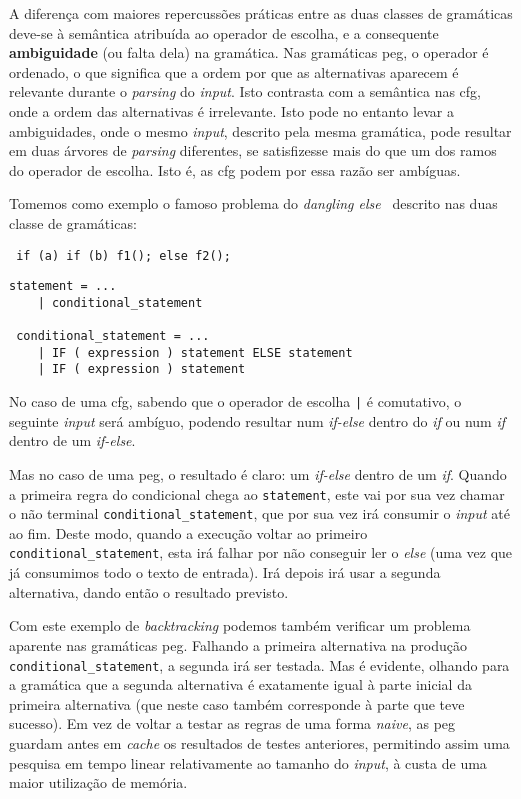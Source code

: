 A diferença com maiores repercussões práticas entre as duas classes de gramáticas deve-se à semântica atribuída ao operador de escolha, e a consequente \textbf{ambiguidade} (ou falta dela) na gramática. Nas gramáticas \acrshort{peg}, o operador é ordenado, o que significa que a ordem por que as alternativas aparecem é relevante durante o \textit{parsing} do \textit{input}. Isto contrasta com a semântica nas \acrshort{cfg}, onde a ordem das alternativas é irrelevante. Isto pode no entanto levar a ambiguidades, onde o mesmo \textit{input}, descrito pela mesma gramática, pode resultar em duas árvores de \textit{parsing} diferentes, se satisfizesse mais do que um dos ramos do operador de escolha. Isto é, as \acrshort{cfg} podem por essa razão ser ambíguas.

Tomemos como exemplo o famoso problema do \textit{dangling else}~\cite{dangling-else} descrito nas duas classe de gramáticas:
\begin{lstlisting}
 if (a) if (b) f1(); else f2();
\end{lstlisting}

\begin{lstlisting}[caption=Gramática,captionpos=t]
 statement = ...
    | conditional_statement
 
 conditional_statement = ...
    | IF ( expression ) statement ELSE statement
    | IF ( expression ) statement
\end{lstlisting}

No caso de uma \acrshort{cfg}, sabendo que o operador de escolha \texttt{|} é comutativo, o seguinte \textit{input} será ambíguo, podendo resultar num \textit{if-else} dentro do \textit{if} ou num \textit{if} dentro de um \textit{if-else}.

Mas no caso de uma \acrshort{peg}, o resultado é claro: um \textit{if-else} dentro de um \textit{if}. Quando a primeira regra do condicional chega ao \texttt{statement}, este vai por sua vez chamar o não terminal \texttt{conditional\_statement}, que por sua vez irá consumir o \textit{input} até ao fim. Deste modo, quando a execução voltar ao primeiro \texttt{conditional\_statement}, esta irá falhar por não conseguir ler o \textit{else} (uma vez que já consumimos todo o texto de entrada). Irá depois irá usar a segunda alternativa, dando então o resultado previsto.

Com este exemplo de \textit{backtracking} podemos também verificar um problema aparente nas gramáticas \acrshort{peg}. Falhando a primeira alternativa na produção \texttt{conditional\_statement}, a segunda irá ser testada. Mas é evidente, olhando para a gramática que a segunda alternativa é exatamente igual à parte inicial da primeira alternativa (que neste caso também corresponde à parte que teve sucesso). Em vez de voltar a testar as regras de uma forma \textit{naive}, as \acrlong{peg} guardam antes em \textit{cache} os resultados de testes anteriores, permitindo assim uma pesquisa em tempo linear relativamente ao tamanho do \textit{input}, à custa de uma maior utilização de memória.

